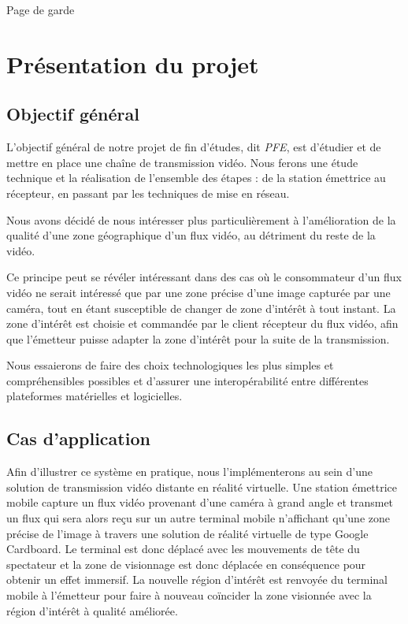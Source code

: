 \documentclass[11pt,a4paper]{article}
\begin{document}
Page de garde

\newpage

\section{Présentation du projet}

\subsection{Objectif général}
L'objectif général de notre projet de fin d'études, dit \textit{PFE}, est d'étudier et de mettre en place une chaîne de transmission vidéo.
Nous ferons une étude technique et la réalisation de l'ensemble des étapes : de la station émettrice au récepteur, en passant par les techniques de mise en réseau.

\bigbreak
Nous avons décidé de nous intéresser plus particulièrement à l'amélioration de la qualité d'une zone géographique d'un flux vidéo, au détriment du reste de la vidéo.

Ce principe peut se révéler intéressant dans des cas où le consommateur d'un flux vidéo ne serait intéressé que par une zone précise d'une image capturée par une caméra, tout en étant susceptible de changer de zone d'intérêt à tout instant.
La zone d'intérêt est choisie et commandée par le client récepteur du flux vidéo, afin que l'émetteur puisse adapter la zone d’intérêt pour la suite de la transmission.

\bigbreak
Nous essaierons de faire des choix technologiques les plus simples et compréhensibles possibles et d'assurer une interopérabilité entre différentes plateformes matérielles et logicielles.

\subsection{Cas d'application}

Afin d'illustrer ce système en pratique, nous l'implémenterons au sein d'une solution de transmission vidéo distante en réalité virtuelle.
Une station émettrice mobile capture un flux vidéo provenant d'une caméra à grand angle et transmet un flux qui sera alors reçu sur un autre terminal mobile n'affichant qu'une zone précise de l'image à travers une solution de réalité virtuelle de type Google Cardboard.
Le terminal est donc déplacé avec les mouvements de tête du spectateur et la zone de visionnage est donc déplacée en conséquence pour obtenir un effet immersif.
La nouvelle région d’intérêt est renvoyée du terminal mobile à l'émetteur pour faire à nouveau coïncider la zone visionnée avec la région d'intérêt à qualité améliorée.
\end{document}
